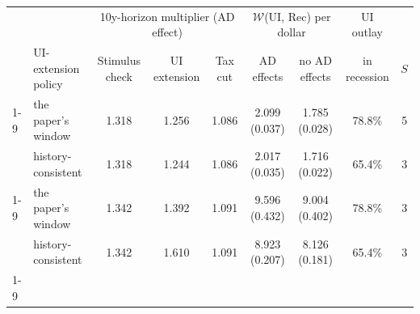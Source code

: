 \begin{tabular}{@{}llccccccc@{}}
\toprule
                  &                     & \multicolumn{3}{c}{10y-horizon multiplier (AD effect)} & \multicolumn{2}{c}{$\mathcal{W}$(UI, Rec) per dollar} & UI outlay    &     \\
                  & UI-extension policy & Stimulus check & UI extension & Tax cut & AD effects & no AD effects & in recession & $S$ \\ \cmidrule(l){1-9}
    \multirow{2}{*}{Baseline ($\rho_b = 0.7$, $\rho_{nb} = 0.5$)} & the paper's window & 1.318 & 1.256 & 1.086 & 2.099 (0.037) & 1.785 (0.028) & 78.8\% & 5 \\
                       & history-consistent & 1.318 & 1.244 & 1.086 & 2.017 (0.035) & 1.716 (0.022) & 65.4\% & 3 \\ \cmidrule(l){1-9}
    \multirow{2}{*}{Altern. ($\rho_b = 0.3$, $\rho_{nb} = 0.15$)} & the paper's window & 1.342 & 1.392 & 1.091 & 9.596 (0.432) & 9.004 (0.402) & 78.8\% & 3 \\
                       & history-consistent & 1.342 & 1.610 & 1.091 & 8.923 (0.207) & 8.126 (0.181) & 65.4\% & 3 \\ \cmidrule(l){1-9}
\end{tabular}

